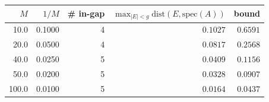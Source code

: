 \begin{tabular}{@{}rrrrr@{}}
\toprule
$M$ & $1/M$ & \# in-gap & $\max_{|E|<g}\mathrm{dist}(E,\mathrm{spec}(A))$ & bound \\
\midrule
10.0 & 0.1000 & 4 & $0.1027$ & $0.6591$ \\
20.0 & 0.0500 & 4 & $0.0817$ & $0.2568$ \\
40.0 & 0.0250 & 5 & $0.0409$ & $0.1156$ \\
50.0 & 0.0200 & 5 & $0.0328$ & $0.0907$ \\
100.0 & 0.0100 & 5 & $0.0164$ & $0.0437$ \\
\bottomrule
\end{tabular}
